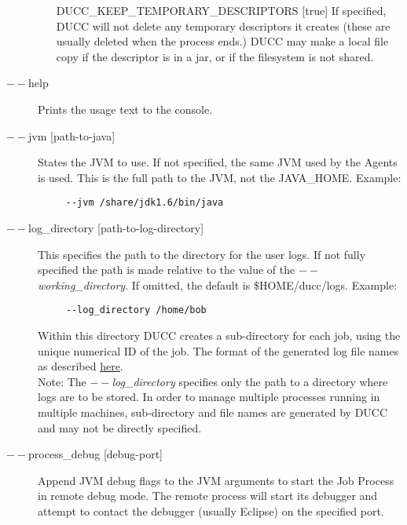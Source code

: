 \begin{description}
\begin{enumerate}
    \item[DUCC\_KEEP\_TEMPORARY\_DESCRIPTORS {[true]}  ]
    If specified, DUCC will not delete any temporary descriptors it creates
    (these are usually deleted when the process ends.)  DUCC may make a local file copy if the
    descriptor is in a jar, or if the filesystem is not shared.
    
  \end{enumerate}


           \item[$--$help ]
             Prints the usage text to the console. 

           \item[$--$jvm {[path-to-java]}  ]
             States the JVM to use. If not specified, the same JVM used by the Agents is used.  This is
             the full path to the JVM, not the JAVA\_HOME.
             Example: 
             \begin{verbatim}
     --jvm /share/jdk1.6/bin/java
             \end{verbatim}
             
           \item[$--$log\_directory {[path-to-log-directory]} ]
             This specifies the path to the directory for the user logs. 
             If not fully specified the path is made relative to the value of the {\em $--$working\_directory}.
             If omitted, the default is \$HOME/ducc/logs. 
             Example: 
             \begin{verbatim}
     --log_directory /home/bob
             \end{verbatim}
             Within this directory DUCC creates a sub-directory for each job, using the unique numerical 
             ID of the job. The format of the generated log file names as described
             \hyperref[chap:job-logs]{here}.
             \\Note: The {\em $--$log\_directory} specifies only the path to a directory where 
             logs are to be stored. In order to manage multiple processes running in multiple 
             machines, sub-directory and file names are generated by DUCC and may 
             not be directly specified. 

           \item[$--$process\_debug {[debug-port]}] Append JVM debug flags to the JVM
             arguments to start the Job Process in remote debug mode.  The remote process will start
             its debugger and attempt to contact the debugger (usually Eclipse) on the specified
             port.
             

\end{description}
